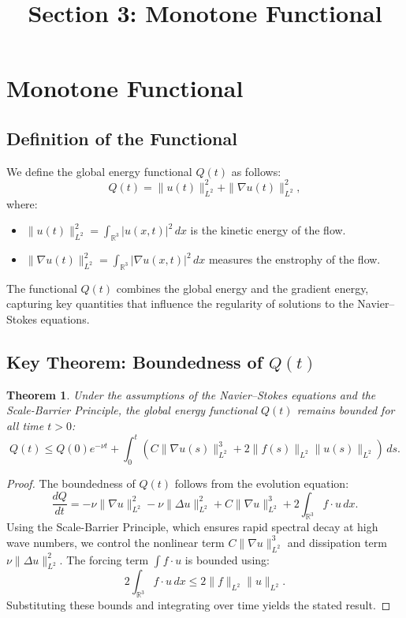 \documentclass[12pt]{article}
\newtheorem{theorem}{Theorem}[section]
\theoremstyle{definition}
\begin{document}
\title{Section 3: Monotone Functional}
\author{}
\date{}
\maketitle

\section{Monotone Functional}

\subsection{Definition of the Functional}
We define the global energy functional $Q(t)$ as follows:
\[
Q(t) = \|u(t)\|_{L^2}^2 + \|\nabla u(t)\|_{L^2}^2,
\]
where:
\begin{itemize}
    \item $\|u(t)\|_{L^2}^2 = \int_{\mathbb{R}^3} |u(x,t)|^2 \, dx$ is the kinetic energy of the flow.
    \item $\|\nabla u(t)\|_{L^2}^2 = \int_{\mathbb{R}^3} |\nabla u(x,t)|^2 \, dx$ measures the enstrophy of the flow.
\end{itemize}

The functional $Q(t)$ combines the global energy and the gradient energy, capturing key quantities that influence the regularity of solutions to the Navier--Stokes equations.

\subsection{Key Theorem: Boundedness of $Q(t)$}
\begin{theorem}
Under the assumptions of the Navier--Stokes equations and the Scale-Barrier Principle, the global energy functional $Q(t)$ remains bounded for all time $t > 0$:
\[
Q(t) \leq Q(0) e^{-\nu t} + \int_0^t \left( C \|\nabla u(s)\|_{L^2}^3 + 2 \|f(s)\|_{L^2}\|u(s)\|_{L^2} \right) \, ds.
\]
\end{theorem}

\begin{proof}
The boundedness of $Q(t)$ follows from the evolution equation:
\[
\frac{dQ}{dt} = -\nu \|\nabla u\|_{L^2}^2 - \nu \|\Delta u\|_{L^2}^2 + C \|\nabla u\|_{L^2}^3 + 2 \int_{\mathbb{R}^3} f \cdot u \, dx.
\]
Using the Scale-Barrier Principle, which ensures rapid spectral decay at high wave numbers, we control the nonlinear term $C \|\nabla u\|_{L^2}^3$ and dissipation term $\nu \|\Delta u\|_{L^2}^2$. The forcing term $\int f \cdot u$ is bounded using:
\[
2 \int_{\mathbb{R}^3} f \cdot u \, dx \leq 2 \|f\|_{L^2}\|u\|_{L^2}.
\]
Substituting these bounds and integrating over time yields the stated result.
\end{proof}
\end{document}
